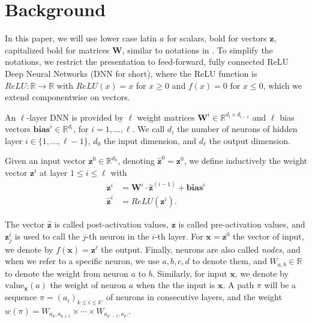 \documentclass{llncs}
\newcommand{\vz}{\boldsymbol{z}}
\newcommand{\vb}{\boldsymbol{bias}}
\newcommand{\val}{{\textrm{value}}}
\begin{document}



\section{Background}

In this paper, we will use lower case latin $a$ for scalars, bold for vectors $\boldsymbol{z}$, 
capitalized bold for matrices $\boldsymbol{W}$, similar to notations in \cite{prima,crown}.
To simplify the notations, we restrict the presentation to feed-forward, 
fully connected ReLU Deep Neural Networks (DNN for short), where the ReLU function is $ReLU : \mathbb{R} \rightarrow \mathbb{R}$ with
$ReLU(x)=x$ for $x \geq 0$ and $f(x)=0$ for $x \leq 0$, which we extend componentwise on vectors.




An $\ell$-layer DNN is provided by $\ell$ weight matrices 
$\boldsymbol{W}^i \in \mathbb{R}^{d_i\times d_{i-1}}$
and $\ell$ bias vectors $\vb^i \in \mathbb{R}^{d_i}$, for $i=1, \ldots, \ell$.
We call $d_i$ the number of neurons of hidden layer $i \in \{1, \ldots, \ell-1\}$,
$d_0$ the input dimension, and $d_\ell$ the output dimension.

Given an input vector $\boldsymbol{z}^0 \in \mathbb{R}^{d_0}$, 
denoting $\hat{\boldsymbol{z}}^{0}={\boldsymbol{z}}^0$, we define inductively the weight vector $\boldsymbol{z}^i$ at layer $1 \leq i \leq \ell$ with
\begin{align*}
	{\boldsymbol{z}}^{i} &= \boldsymbol{W}^i\cdot \hat{\boldsymbol{z}}^{(i-1)}+ \vb^i\\
	\hat{\boldsymbol{z}}^{i} &= ReLU({\boldsymbol{z}}^i).
\end{align*} 

The vector $\hat{\boldsymbol{z}}$ is called post-activation values, 
$\boldsymbol{z}$ is called pre-activation values, 
and $\boldsymbol{z}^{i}_j$ is used to call the $j$-th neuron in the $i$-th layer. 
For $\boldsymbol{x}=\vz^0$ the vector of input, we denote by $f(\boldsymbol{x})=\vz^\ell$ the output. Finally, neurons are also called \emph{nodes}, and when we refer to a specific neuron, we use $a,b,c,d$ to denote them, and $W_{a,b} \in \mathbb{R}$ to denote the weight from neuron $a$ to $b$. Similarly, for input $\boldsymbol{x}$, we denote by $\val_{\boldsymbol{x}}(a)$ the weight of neuron $a$ when the the input is $\boldsymbol{x}$. A path $\pi$ will be a sequence 
$\pi=(a_i)_{k \leq  i \leq k'}$ of neurons in consecutive layers, and the weight $w(\pi)=W_{a_k,a_{k+1}} \times \cdots \times  W_{a_{k'-1},a_{k'}}$.
\end{document}
